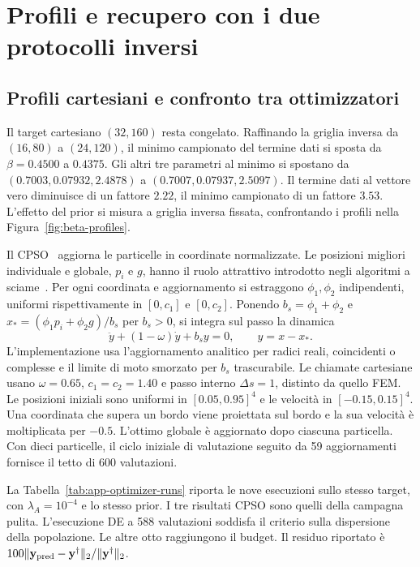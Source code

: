 \section{Profili e recupero con i due protocolli inversi}
\label{app:optimizer}
\setcounter{figure}{0}\setcounter{table}{0}\setcounter{equation}{0}

\subsection{Profili cartesiani e confronto tra ottimizzatori}
Il target cartesiano $(32,160)$ resta congelato. Raffinando la griglia inversa da $(16,80)$ a $(24,120)$, il minimo campionato del termine dati si sposta da $\beta=0.4500$ a $0.4375$. Gli altri tre parametri al minimo si spostano da $(0.7003,0.07932,2.4878)$ a $(0.7007,0.07937,2.5097)$. Il termine dati al vettore vero diminuisce di un fattore $2.22$, il minimo campionato di un fattore $3.53$. L'effetto del prior si misura a griglia inversa fissata, confrontando i profili nella Figura~\ref{fig:beta-profiles}.

Il CPSO~\citep{orlando2021analyticCPSO} aggiorna le particelle in coordinate normalizzate. Le posizioni migliori individuale e globale, $p_i$ e $g$, hanno il ruolo attrattivo introdotto negli algoritmi a sciame~\citep{kennedyndparticle}. Per ogni coordinata e aggiornamento si estraggono $\phi_1,\phi_2$ indipendenti, uniformi rispettivamente in $[0,c_1]$ e $[0,c_2]$. Ponendo $b_s=\phi_1+\phi_2$ e $x_*=(\phi_1p_i+\phi_2g)/b_s$ per $b_s>0$, si integra sul passo la dinamica
\[
 \ddot y+(1-\omega)\dot y+b_s y=0,\qquad y=x-x_* .
\]
L'implementazione usa l'aggiornamento analitico per radici reali, coincidenti o complesse e il limite di moto smorzato per $b_s$ trascurabile. Le chiamate cartesiane usano $\omega=0.65$, $c_1=c_2=1.40$ e passo interno $\Delta s=1$, distinto da quello FEM. Le posizioni iniziali sono uniformi in $[0.05,0.95]^4$ e le velocità in $[-0.15,0.15]^4$. Una coordinata che supera un bordo viene proiettata sul bordo e la sua velocità è moltiplicata per $-0.5$. L'ottimo globale è aggiornato dopo ciascuna particella. Con dieci particelle, il ciclo iniziale di valutazione seguito da 59 aggiornamenti fornisce il tetto di 600 valutazioni.

La Tabella~\ref{tab:app-optimizer-runs} riporta le nove esecuzioni sullo stesso target, con $\lambda_A=10^{-4}$ e lo stesso prior. I tre risultati CPSO sono quelli della campagna pulita. L'esecuzione DE a 588 valutazioni soddisfa il criterio sulla dispersione della popolazione. Le altre otto raggiungono il budget. Il residuo riportato è $100\|\mathbf y_{\rm pred}-\mathbf y^\dagger\|_2/\|\mathbf y^\dagger\|_2$.

